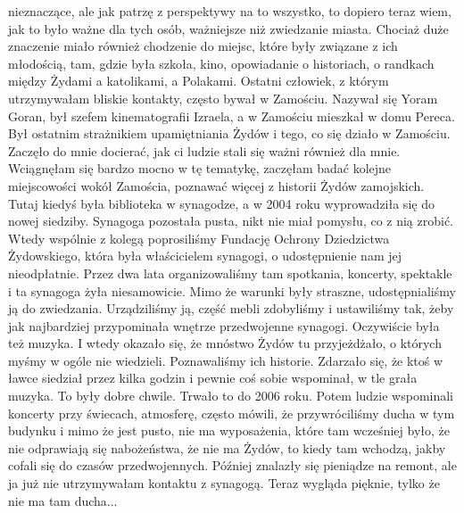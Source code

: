 \begin{otherlanguage}{polish}
nieznaczące, ale jak patrzę z perspektywy na to wszystko, to dopiero teraz wiem, jak to było ważne dla tych osób, ważniejsze niż zwiedzanie miasta. Chociaż duże znaczenie miało również chodzenie do miejsc, które były związane z ich młodością, tam, gdzie była szkoła, kino, opowiadanie o historiach, o randkach między Żydami a katolikami, a Polakami. Ostatni człowiek, z którym utrzymywałam bliskie kontakty, często bywał w Zamościu. Nazywał się Yoram Goran, był szefem kinematografii Izraela, a w Zamościu mieszkał w domu Pereca. Był ostatnim strażnikiem upamiętniania Żydów i tego, co się działo w Zamościu. Zaczęło do mnie docierać, jak ci ludzie stali się ważni również dla mnie. Wciągnęłam się bardzo mocno w tę tematykę, zaczęłam badać kolejne miejscowości wokół Zamościa, poznawać więcej z historii Żydów zamojskich. Tutaj kiedyś była biblioteka w synagodze, a w 2004 roku wyprowadziła się do nowej siedziby. Synagoga pozostała pusta, nikt nie miał pomysłu, co z nią zrobić. Wtedy wspólnie z kolegą poprosiliśmy Fundację Ochrony Dziedzictwa Żydowskiego, która była właścicielem synagogi, o udostępnienie nam jej nieodpłatnie. Przez dwa lata organizowaliśmy tam spotkania, koncerty, spektakle i ta synagoga żyła niesamowicie. Mimo że warunki były straszne, udostępnialiśmy ją do zwiedzania. Urządziliśmy ją, część mebli zdobyliśmy i ustawiliśmy tak, żeby jak najbardziej przypominała wnętrze przedwojenne synagogi. Oczywiście była też muzyka. I wtedy okazało się, że mnóstwo Żydów tu przyjeżdżało, o których myśmy w ogóle nie wiedzieli. Poznawaliśmy ich historie. Zdarzało się, że ktoś w ławce siedział przez kilka godzin i pewnie coś sobie wspominał, w tle grała muzyka. To były dobre chwile. Trwało to do 2006 roku. Potem ludzie wspominali koncerty przy świecach, atmosferę, często mówili, że przywróciliśmy ducha w tym budynku i mimo że jest pusto, nie ma wyposażenia, które tam wcześniej było, że nie odprawiają się nabożeństwa, że nie ma Żydów, to kiedy tam wchodzą, jakby cofali się do czasów przedwojennych. Później znalazły się pieniądze na remont, ale ja już nie utrzymywałam kontaktu z synagogą. Teraz wygląda pięknie, tylko że nie ma tam ducha...\\

\end{otherlanguage}
